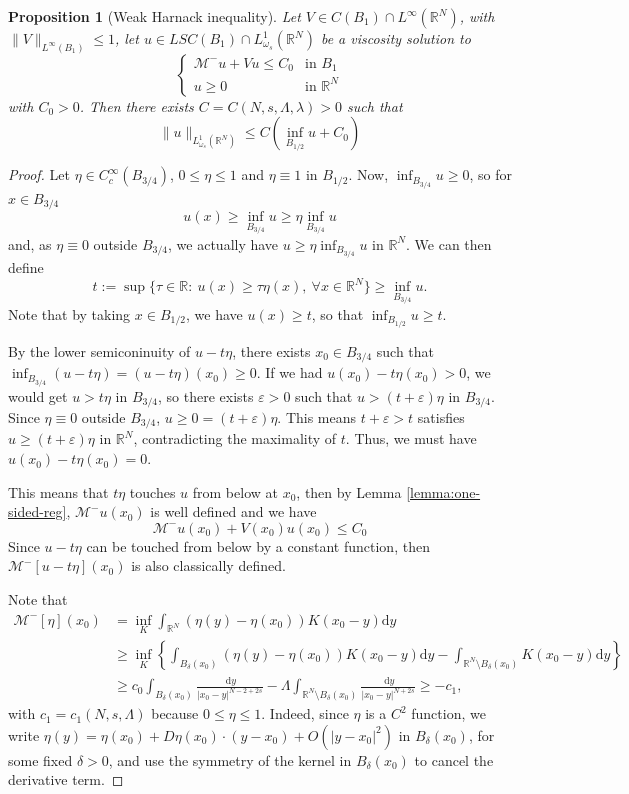 \documentclass[a4paper,11pt]{article}
\newcommand{\R}{\mathbb{R}}
\newcommand{\M}{\mathcal{M}}
\newcommand{\Lomega}{L_{\omega_s}^1(\R^N)}
\newtheorem{proposition}[theorem]{Proposition}
\begin{document}
\begin{proposition}[Weak Harnack inequality]
\label{prop:weakharnack}
Let $V \in C(B_1)\cap L^{\infty}(\R^N)$, with $\|V\|_{L^{\infty}(B_1)} \leq 1$, let $u\in LSC(B_1) \cap L^1_{\omega_s}(\R^N)$ be a viscosity solution to 
\[\begin{cases}
\M^-u + Vu \leq C_0 & \text{in }B_1\\
u\geq 0 & \text{in } \R^N
\end{cases}\]
with $C_0 > 0$. Then there exists $C=C(N,s,\Lambda, \lambda)>0$ such that
\[\|u\|_{\Lomega}\leq C(\inf_{B_{1/2}}u + C_{0}) \]
\end{proposition}

\begin{proof}
Let $\eta\in C_c^{\infty}(B_{3/4})$, $0\leq \eta \leq 1$ and $\eta\equiv 1$ in $B_{1/2}$. Now, $\inf_{B_{3/4}} u \geq 0$, so for $x\in B_{3/4}$
\[u(x) \geq \inf_{B_{3/4}} u \geq \eta \inf_{B_{3/4}} u\]
and, as $\eta \equiv 0$ outside $B_{3/4}$, we actually have $u\geq \eta \inf_{B_{3/4}} u$ in $\R^N$. We can then define
\[t:=\sup\{\tau \in \R:~ u(x) \geq \tau\eta(x),~\forall x\in \R^N\}\ge \inf_{B_{3/4}} u . \]
Note that by taking $x\in B_{1/2}$, we have $u(x)\geq t$, so that $\inf_{B_{1/2}}u \geq t$.

By the lower semiconinuity of $u - t\eta$, there exists $x_0\in B_{3/4}$ such that $\inf_{B_{3/4}}(u-t\eta) = (u-t\eta)(x_0)\geq 0$. If we had $u(x_0)-t \eta(x_0) > 0$, we would get $u > t \eta $ in $B_{3/4}$, so there exists $\varepsilon >0$ such that $u>(t+ \varepsilon)\eta$ in $B_{3/4}$. Since $\eta \equiv 0$ outside $B_{3/4}$, $u\geq 0 = (t+\varepsilon)\eta$. This means $t + \varepsilon >t$ satisfies $u\geq (t+\varepsilon)\eta$ in  $\R^N$, contradicting the maximality of $t$. Thus, we must have $u(x_0) - t\eta(x_0) = 0$.

This means that $t\eta$ touches $u$ from below at $x_0$, then by Lemma \ref{lemma:one-sided-reg}, $\M^-u(x_0)$ is well defined and we have
\[\M^-u(x_0) +V(x_0) u(x_0) \leq C_0\]
Since $u-t\eta$ can be touched from below by a constant function, then $\M^-[u-t\eta](x_0)$ is also classically defined.

Note that
$$\begin{aligned} 
	\mathcal{M}^{-}[\eta]\left(x_0\right) 
	& =\inf _{K} \int_{\mathbb{R}^N}\left(\eta(y)-\eta\left(x_0\right)\right) K\left(x_0-y\right) \mathrm{d} y \\ 
	& \geq \inf _{K} 
	\left\{
	\int_{ B_\delta (x_0)}
	(\eta(y)- \eta( x_0 )) K\left(x_0-y\right) \mathrm{d} y 
	-   \int_{ \mathbb{R}^N  \setminus B_\delta (x_0) }
	K\left(x_0-y\right) \mathrm{d} y 
	\right\} \\ 
	& 
	\ge c_0 
	\int_{B_\delta (x_0)} 
	\frac{  \mathrm{~d} y }{\left|x_0-y\right|^{N-2+2 s}}
	- \Lambda \int_{ \mathbb{R}^N \setminus B_\delta (x_0) } 
	\frac{\mathrm{~d} y}{\left|x_0-y\right|^{N+2 s}} 
	\geq-c_1,
\end{aligned}$$
with $c_1 =c_1 ( N,s,\Lambda)$ because $ 0 \leq \eta \leq 1 $. Indeed, since $\eta $ is a $C^2 $ function, we write
$\eta (y)=\eta (x_0)+D\eta (x_0) \cdot (y-x_0)+O(|y-x_0|^2)$ in $B_\delta (x_0)$, for some fixed $\delta >0$, and use
the symmetry of  the kernel in $B_\delta (x_0)$ to cancel the derivative term.


\end{proof}
\end{document}
